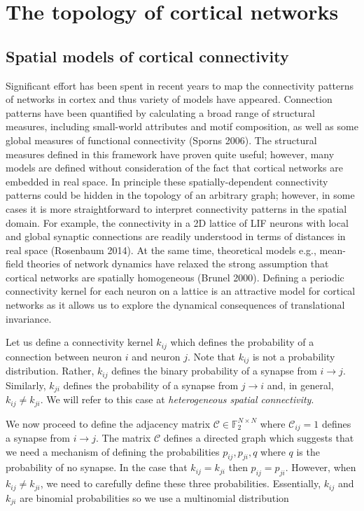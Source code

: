 \documentclass{ucetd}
\begin{document}
\chapter{The topology of cortical networks}

\section{Spatial models of cortical connectivity}

Significant effort has been spent in recent years to map the connectivity patterns of networks in cortex and thus variety of models have appeared. Connection patterns have been quantified by calculating a broad range of structural measures, including small-world attributes and motif composition, as well as some global measures of functional connectivity (Sporns 2006). The structural measures defined in this framework have proven quite useful; however, many models are defined without consideration of the fact that cortical networks are embedded in real space. In principle these spatially-dependent connectivity patterns could be hidden in the topology of an arbitrary graph; however, in some cases it is more straightforward to interpret connectivity patterns in the spatial domain. For example, the connectivity in a 2D lattice of LIF neurons with local and global synaptic connections are readily understood in terms of distances in real space (Rosenbaum 2014). At the same time, theoretical models e.g., mean-field theories of network dynamics have relaxed the strong assumption that cortical networks are spatially homogeneous (Brunel 2000). Defining a periodic connectivity kernel for each neuron on a lattice is an attractive model for cortical networks as it allows us to explore the dynamical consequences of translational invariance.


Let us define a connectivity kernel $k_{ij}$ which defines the probability of a connection between neuron $i$ and neuron $j$. Note that $k_{ij}$ is not a probability distribution. Rather, $k_{ij}$ defines the binary probability of a synapse from $i\rightarrow j$. Similarly, $k_{ji}$ defines the probability of a synapse from $j\rightarrow i$ and, in general, $k_{ij} \neq k_{ji}$. We will refer to this case at \emph{heterogeneous spatial connectivity}. 

We now proceed to define the adjacency matrix $\mathcal{C} \in \mathbb{F}_{2}^{N\times N}$ where $\mathcal{C}_{ij} = 1$ defines a synapse from $i\rightarrow j$. The matrix $\mathcal{C}$ defines a directed graph which suggests that we need a mechanism of defining the probabilities $p_{ij}, p_{ji}, q$ where $q$ is the probability of no synapse. In the case that $k_{ij} = k_{ji}$ then $p_{ij} =  p_{ji}$. However, when $k_{ij} \neq k_{ji}$, we need to carefully define these three probabilities. Essentially, $k_{ij}$ and $k_{ji}$ are binomial probabilities so we use a multinomial distribution
\end{document}
